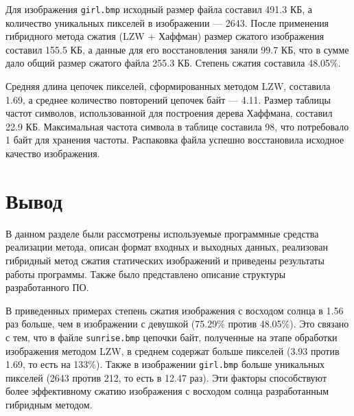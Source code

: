 


Для изображения \texttt{girl.bmp} исходный размер файла составил 491.3 КБ, а количество уникальных пикселей в изображении --- 2643. После применения гибридного метода сжатия (LZW + Хаффман) размер сжатого изображения составил 155.5 КБ, а данные для его восстановления заняли 99.7 КБ, что в сумме дало общий размер сжатого файла 255.3 КБ. Степень сжатия составила 48.05\%.

Средняя длина цепочек пикселей, сформированных методом LZW, составила 1.69, а среднее количество повторений цепочек байт --- 4.11. Размер таблицы частот символов, использованной для построения дерева Хаффмана, составил 22.9 КБ. Максимальная частота символа в таблице составила 98, что потребовало 1 байт для хранения частоты. Распаковка файла успешно восстановила исходное качество изображения.

\section*{Вывод}

В данном разделе были рассмотрены используемые программные средства реализации метода, описан формат входных и выходных данных, реализован гибридный метод сжатия статических изображений и приведены результаты работы программы. Также было представлено описание структуры разработанного ПО.

В приведенных примерах степень сжатия изображения с восходом солнца в 1.56 раз больше, чем в изображении с девушкой (75.29\% против 48.05\%). Это связано с тем, что в файле \texttt{sunrise.bmp} цепочки байт, полученные на этапе обработки изображения методом LZW, в среднем содержат больше пикселей (3.93 против 1.69, то есть на 133\%). Также в изображении \texttt{girl.bmp} больше уникальных пикселей (2643 против 212, то есть в 12.47 раз). Эти факторы способствуют более эффективному сжатию изображения с восходом солнца разработанным гибридным методом.

